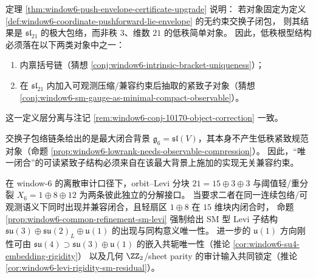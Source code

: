 \begin{remark}[与低秩预期对象的差异定位]\label{rem:window6-conjectural-gap-object-layer}
定理 \ref{thm:window6-push-envelope-certificate-upgrade} 说明：
若对象固定为定义 \ref{def:window6-coordinate-pushforward-lie-envelope} 的无约束交换子闭包，
则其结果是 \(\mathfrak{sl}_{21}\) 的极大包络，而非秩 \(3\)、维数 \(21\) 的低秩简单对象。
因此，低秩根型结构必须落在以下两类对象中之一：
\begin{enumerate}
  \item 内禀括号链（猜想 \ref{conj:window6-intrinsic-bracket-uniqueness}）；
  \item 在 \(\mathfrak{sl}_{21}\) 内加入可观测压缩/兼容约束后抽取的紧致子对象（猜想 \ref{conj:window6-sm-gauge-as-minimal-compact-observable}）。
\end{enumerate}
这一定义层分离与注记 \ref{rem:window6-conj-10170-object-correction} 一致。
\end{remark}

\begin{remark}\label{rem:window6-orbit-levi-threshold-compatible-closure}
交换子包络链条给出的是最大闭合背景 \(\mathfrak g_6=\mathfrak{sl}(V)\)，其本身不产生低秩紧致规范对象（命题 \ref{prop:window6-lowrank-needs-observable-compression}）。
因此，“唯一闭合”的可读紧致子结构必须来自在该最大背景上施加的实现无关兼容约束。
\par
在 window-\(6\) 的离散审计口径下，orbit--Levi 分块 \(21=15\oplus 3\oplus 3\) 与阈值轻/重分裂 \(X_6=1\oplus 8\oplus 12\) 为两条彼此独立的分解接口。
当要求二者在同一连续包络/可观测语义下同时出现并兼容闭合，且轻扇区 \(1\oplus 8\) 在 \(15\) 维块内闭合时，
命题 \ref{prop:window6-common-refinement-sm-levi} 强制给出 SM 型 Levi 子结构
\(
\mathfrak{su}(3)\oplus\mathfrak{su}(2)_L\oplus\mathfrak u(1)
\)
的出现与同构意义唯一性。
进一步的 \(\mathfrak u(1)\) 方向刚性可由 \(\mathfrak{su}(4)\supset \mathfrak{su}(3)\oplus\mathfrak u(1)\) 的嵌入共轭唯一性（推论 \ref{cor:window6-su4-embedding-rigidity}）
以及几何 \(\ZZ_2\)/sheet parity 的审计输入共同锁定（推论 \ref{cor:window6-levi-rigidity-sm-residual}）。
\end{remark}

